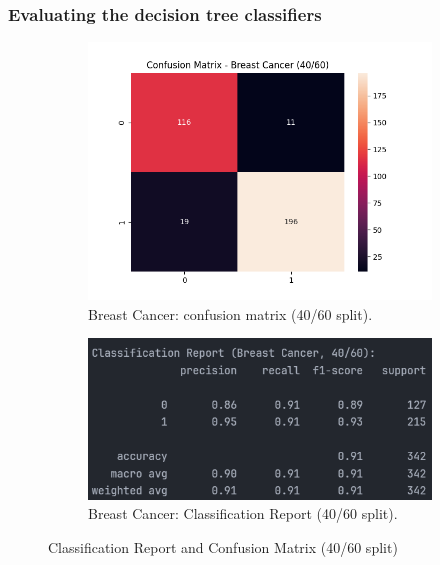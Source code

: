 \subsubsection*{Evaluating the decision tree classifiers}
\begin{figure}[H]
	\centering
	\begin{subfigure}{0.45\textwidth}
		\centering
		\includegraphics[width=\textwidth]{imgs/confusion_mat/confusion_mat__breast_cancer__40_vs_60.png}
		\caption{Breast Cancer: confusion matrix (40/60 split).}\label{fig:bc-cm-40-60}
	\end{subfigure}
	\hfill
	\begin{subfigure}{0.45\textwidth}
		\centering
		\includegraphics[width=\textwidth]{imgs/confusion_mat/class_rp__breast_cancer__40_vs_60.png}
		\caption{Breast Cancer: Classification Report (40/60 split).}\label{fig:bc-cr-40-60}
	\end{subfigure}

	\caption{Classification Report and Confusion Matrix (40/60 split)}\label{fig:bc-eval-40-60}
\end{figure}
